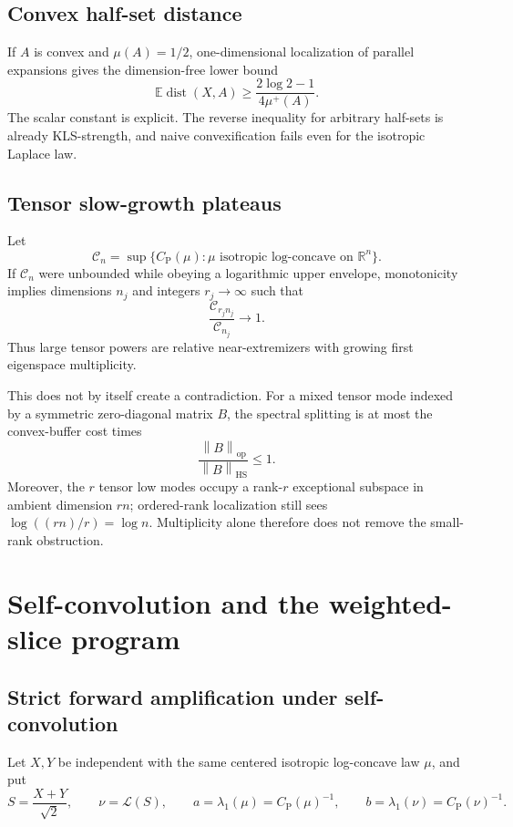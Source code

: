\documentclass[11pt]{article}
\theoremstyle{definition}
\theoremstyle{remark}
\newcommand{\R}{\mathbb R}
\newcommand{\E}{\mathbb E}
\newcommand{\op}{\mathrm{op}}
\newcommand{\HS}{\mathrm{HS}}
\newcommand{\1}{\mathbf 1}
\newcommand{\CP}{C_{\mathrm P}}
\newcommand{\norm}[1]{\left\lVert #1\right\rVert}
\begin{document}
\subsection{Convex half-set distance}

If \(A\) is convex and \(\mu(A)=1/2\), one-dimensional localization of
parallel expansions gives the dimension-free lower bound
\[
 \boxed{\qquad
 \E\operatorname{dist}(X,A)
 \ge \frac{2\log2-1}{4\mu^+(A)}.
 \qquad}                                              \tag{8.1}
\]
The scalar constant is explicit.  The reverse inequality for arbitrary
half-sets is already KLS-strength, and naive convexification fails even for
the isotropic Laplace law.

\subsection{Tensor slow-growth plateaus}

Let
\[
 \mathcal C_n=\sup\{\CP(\mu):\mu\text{ isotropic log-concave on }\R^n\}.
\]
If \(\mathcal C_n\) were unbounded while obeying a logarithmic upper
envelope, monotonicity implies dimensions \(n_j\) and integers
\(r_j\to\infty\) such that
\[
 \frac{\mathcal C_{r_jn_j}}{\mathcal C_{n_j}}\to1.   \tag{8.2}
\]
Thus large tensor powers are relative near-extremizers with growing first
eigenspace multiplicity.

This does not by itself create a contradiction.  For a mixed tensor mode
indexed by a symmetric zero-diagonal matrix \(B\), the spectral splitting
is at most the convex-buffer cost times
\[
                         \frac{\norm B_{\op}}{\norm B_{\HS}}\le1. \tag{8.3}
\]
Moreover, the \(r\) tensor low modes occupy a rank-\(r\) exceptional
subspace in ambient dimension \(rn\); ordered-rank localization still sees
\(\log((rn)/r)=\log n\).  Multiplicity alone therefore does not remove the
small-rank obstruction.

\section{Self-convolution and the weighted-slice program}

\subsection{Strict forward amplification under self-convolution}

Let \(X,Y\) be independent with the same centered isotropic log-concave
law \(\mu\), and put
\[
 S=\frac{X+Y}{\sqrt2},\qquad \nu=\mathcal L(S),\qquad
 a=\lambda_1(\mu)=\CP(\mu)^{-1},\qquad
 b=\lambda_1(\nu)=\CP(\nu)^{-1}.
\]
\end{document}
